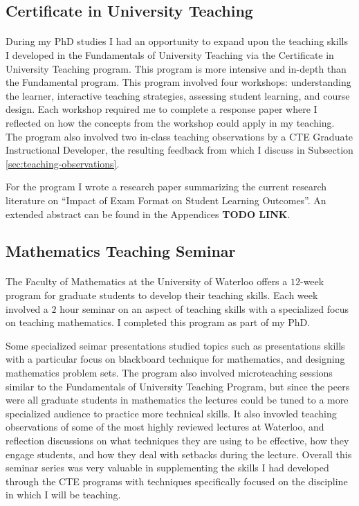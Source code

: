 \documentclass{article}
\begin{document}
\subsection{Certificate in University Teaching}
\paragraph{}During my PhD studies I had an opportunity to expand upon the teaching skills I developed in the Fundamentals of University Teaching via the Certificate in University Teaching program. This program is more intensive and in-depth than the Fundamental program. This program involved four workshops: understanding the learner, interactive teaching strategies, assessing student learning, and course design. Each workshop required me to complete a response paper where I reflected on how the concepts from the workshop could apply in my teaching. The program also involved two in-class teaching observations by a CTE Graduate Instructional Developer, the resulting feedback from which I discuss in Subsection \ref{sec:teaching-observations}.

For the program I wrote a research paper summarizing the current research literature on ``Impact of Exam Format on Student Learning Outcomes''. An extended abstract can be found in the Appendices \textbf{TODO LINK}. 

\subsection{Mathematics Teaching Seminar} 
\paragraph{}
The Faculty of Mathematics at the University of Waterloo offers a $12$-week program for graduate students to develop their teaching skills. Each week involved a $2$ hour seminar on an aspect of teaching skills with a specialized focus on teaching mathematics. I completed this program as part of my PhD.

Some specialized seimar presentations studied topics such as presentations skills with a particular focus on blackboard technique for mathematics,  and designing mathematics problem sets. The program also involved microteaching sessions similar to the Fundamentals of University Teaching Program, but since the peers were all graduate students in mathematics the lectures could be tuned to a more specialized audience to practice more technical skills. It also invovled teaching observations of some of the most highly reviewed lectures at Waterloo, and reflection discussions on what techniques they are using to be effective, how they engage students, and how they deal with setbacks during the lecture. Overall this seminar series was very valuable in supplementing the skills I had developed through the CTE programs with techniques specifically focused on the discipline in which I will be teaching.
\end{document}
